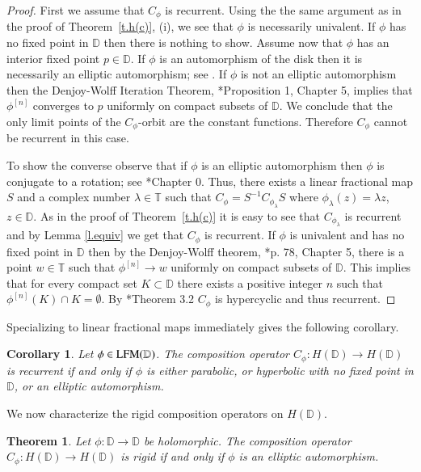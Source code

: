 \documentclass[12pt,leqno]{amsart}
\theoremstyle{plain}
\newtheorem{theorem}[equation]{Theorem}
\newtheorem{corollary}[equation]{Corollary}
\theoremstyle{definition}
\numberwithin{equation}{section}
\begin{document}
\begin{proof}
	First we assume that $C_\phi$ is recurrent. Using the the same argument as in the proof of Theorem~\ref{t.h(c)}, (i), we see that $\phi$ is necessarily univalent. If $\phi$ has no fixed point in $\mathbb D$ then there is nothing to show. Assume now that $\phi$ has an interior fixed point $p\in\mathbb D$. If $\phi$ is an automorphism of the disk then it is necessarily an elliptic automorphism; see \cite{ShapB}. If $\phi$ is not an elliptic automorphism then the Denjoy-Wolff Iteration Theorem, \cite{ShapB}*{Proposition 1, Chapter 5}, implies that $\phi^{[n]}$ converges to $p$ uniformly on compact subsets of $\mathbb D$. We conclude that the only limit points of the $C_\phi$-orbit are the constant functions. Therefore $C_\phi$ cannot be recurrent in this case.
	
	To show the converse observe that if $\phi$ is an elliptic automorphism then $\phi$ is conjugate to a rotation; see \cite{ShapB}*{Chapter 0}. Thus, there exists a linear fractional map $S$ and a complex number $\lambda\in \mathbb T$ such that $C_\phi=S^{-1} C_{\phi_\lambda} S$ where $\phi_\lambda (z)=\lambda z$, $z\in\mathbb D$. As in the proof of Theorem~\ref{t.h(c)} it is easy to see that $C_{\phi_\lambda}$ is recurrent and by Lemma \ref{l.equiv} we get that $C_\phi$ is recurrent. If $\phi$ is univalent and has no fixed point in $\mathbb D$ then by the Denjoy-Wolff theorem, \cite{ShapB}*{p. 78, Chapter 5}, there is a point $w\in \mathbb T$ such that $\phi^{[n]}\to w$ uniformly on compact subsets of $\mathbb D$. This implies that for every compact set $K\subset \mathbb D$ there exists a positive integer $n$ such that $ \phi^{[n]}(K)\cap K=\emptyset$. By \cite{ERMO}*{Theorem 3.2} $C_\phi$ is hypercyclic and thus recurrent.
\end{proof}
Specializing to linear fractional maps immediately gives the following corollary.

\begin{corollary} Let $\phi\in{\textnormal{LFM} (\mathbb D)}$. The composition operator $C_\phi:H(\mathbb D)\to H(\mathbb D)$ is recurrent if and only if $\phi$ is either parabolic, or hyperbolic with no fixed point in $\mathbb D$, or an elliptic automorphism.
\end{corollary}

We now characterize the rigid composition operators on $H(\mathbb D)$.

\begin{theorem}
	Let $\phi:\mathbb D\to \mathbb D$ be holomorphic. The composition operator $C_\phi:H(\mathbb D)\to H(\mathbb D)$ is rigid if and only if $\phi$ is an elliptic automorphism. 
\end{theorem}
\end{document}
